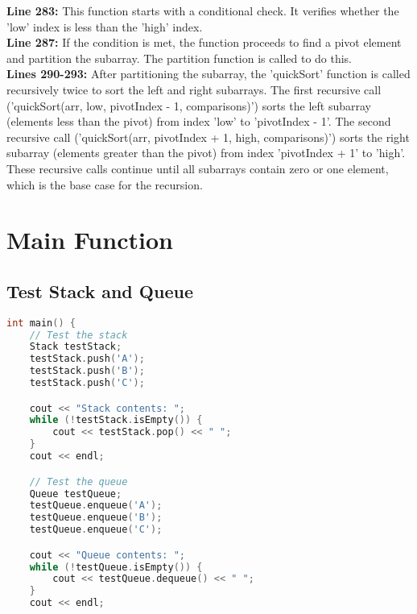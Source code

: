 \documentclass[letterpaper, 10pt,DIV=13]{scrartcl}
\numberwithin{equation}{section} %
\numberwithin{figure}{section} %
\numberwithin{table}{section} %
\begin{document}
\textbf{Line 283:} This function starts with a conditional check. It verifies whether the 'low' index is less than the 'high' index. \\
\textbf{Line 287:} If the condition is met, the function proceeds to find a pivot element and partition the subarray. The partition function is called to do this. \\
\textbf{Lines 290-293:} After partitioning the subarray, the 'quickSort' function is called recursively twice to sort the left and right subarrays. The first recursive call ('quickSort(arr, low, pivotIndex - 1, comparisons)') sorts the left subarray (elements less than the pivot) from index 'low' to 'pivotIndex - 1'. The second recursive call ('quickSort(arr, pivotIndex + 1, high, comparisons)') sorts the right subarray (elements greater than the pivot) from index 'pivotIndex + 1' to 'high'. These recursive calls continue until all subarrays contain zero or one element, which is the base case for the recursion.



\pagebreak

\section{Main Function}
\subsection{Test Stack and Queue}
\begin{linenumbers}
\begin{lstlisting}[language=C++, caption={Test Stack and Queue}, label={code:example}]
int main() {
    // Test the stack
    Stack testStack;
    testStack.push('A');
    testStack.push('B');
    testStack.push('C');

    cout << "Stack contents: ";
    while (!testStack.isEmpty()) {
        cout << testStack.pop() << " ";
    }
    cout << endl;

    // Test the queue
    Queue testQueue;
    testQueue.enqueue('A');
    testQueue.enqueue('B');
    testQueue.enqueue('C');

    cout << "Queue contents: ";
    while (!testQueue.isEmpty()) {
        cout << testQueue.dequeue() << " ";
    }
    cout << endl;
\end{lstlisting}
\end{linenumbers}
\nolinenumbers
\end{document}
